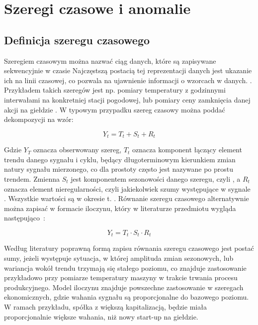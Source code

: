 \documentclass[a4paper,twoside,12pt]{book}
\begin{document}
	\newpage
	\section{Szeregi czasowe i anomalie}

	\subsection{Definicja szeregu czasowego}
		Szeregiem czasowym można nazwać ciąg danych, które są zapisywane sekwencyjnie w czasie \cite{zamanzadeh2024deep} Najczęstszą postacią tej reprezentacji danych jest ukazanie ich na linii czasowej, co pozwala na ujawnienie informacji o wzorcach w danych. \cite{ naqvi2017time}. Przykładem takich szeregów jest np. pomiary temperatury z godzinnymi interwałami na konkretniej stacji pogodowej, lub pomiary ceny zamknięcia danej akcji na giełdzie \cite{naqvi2017time}. W typowym przypadku szereg czasowy można poddać dekompozycji na wzór:
	
	\begin{equation}
		Y_t = T_t + S_t + R_t
	\end{equation}
	
	Gdzie $Y_T$ oznacza obserwowany szereg, $T_t$ oznacza komponent łączący element trendu danego sygnału i cyklu, będący długoterminowym kierunkiem zmian natury sygnału mierzonego, co dla prostoty często jest nazywane po prostu trendem. Zmienna $S_t$ jest komponentem sezonowości danego szeregu, czyli , a $R_t$ oznacza element nieregularności, czyli jakiekolwiek szumy występujące w sygnale . Wszystkie wartości są w okresie t. \cite{dudek2023std}. Równanie szeregu czasowego alternatywnie można zapisać w formacie iloczynu, który w literaturze przedmiotu wygląda następująco~\cite{hyndman2018forecasting}:
	
	\begin{equation}
		Y_t = T_t \cdot S_t \cdot R_t
		\label{eq:multiplicative_model}
	\end{equation}
	
	Według literatury poprawną formą zapisu równania szeregu czasowego jest postać sumy, jeżeli występuje sytuacja, w której amplituda zmian sezonowych, lub wariancja wokół trendu trzymają się stałego poziomu, co znajduje zastosowanie przykładowo przy pomiarze temperatury maszyny w trakcie trwania procesu produkcyjnego. Model iloczynu znajduje powszechne zastosowanie w szeregach ekonomicznych, gdzie wahania sygnału są proporcjonalne do bazowego poziomu. W ramach przykładu, spółka z większą kapitalizacją, będzie miała proporcjonalnie większe wahania, niż nowy start-up na giełdzie.
	
\end{document}
